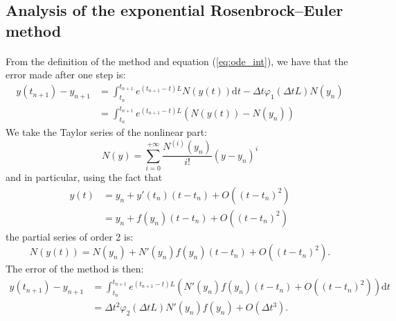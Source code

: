     \subsection{Analysis of the exponential Rosenbrock--Euler method}

      \paragraph{}
      From the definition of the method and equation (\ref{eq:ode_int}), we have that the error made after one step is:
      \begin{equation}
        \begin{aligned}
          y\left(t_{n+1}\right) - y_{n+1} &= \int_{t_n}^{t_{n+1}} e^{\left(t_{n+1} - t\right) L} N\left(y\left(t\right)\right) \mathrm{d}t  - \Delta t \varphi_1\left(\Delta t L\right) N\left(y_n\right) \\
          &= \int_{t_n}^{t_{n+1}} e^{\left(t_{n+1} - t\right) L} \left( N\left(y\left(t\right)\right) - N\left(y_n\right) \right)
        \end{aligned}
      \end{equation}
      We take the Taylor series of the nonlinear part:
      \begin{equation}
        N\left(y\right) = \sum_{i = 0}^{+\infty} \frac{N^{\left(i\right)}\left(y_n\right)}{i!}\left(y - y_n\right)^i
      \end{equation}
      and in particular, using the fact that
      \begin{equation}
        \begin{aligned}
          y\left(t\right) &= y_n + y'\left(t_n\right)\left(t - t_n\right) + O\left(\left(t - t_n\right)^2\right) \\
          & = y_n + f\left(y_n\right)\left(t - t_n\right) + O\left(\left(t - t_n\right)^2\right)
        \end{aligned}
      \end{equation}
      the partial series of order 2 is:
      \begin{equation}
        N\left(y\left(t\right)\right) = N\left(y_n\right) + N'\left(y_n\right)f\left(y_n\right)\left(t - t_n\right) + O\left(\left(t - t_n\right)^2\right) .
      \end{equation}
      The error of the method is then:
      \begin{equation}
        \begin{aligned}
          y\left(t_{n+1}\right) - y_{n+1} &= \int_{t_n}^{t_{n+1}} e^{\left(t_{n+1} - t\right) L} \left( N'\left(y_n\right)f\left(y_n\right)\left(t - t_n\right) + O\left(\left(t - t_n\right)^2\right) \right) \mathrm{d}t \\
          &= \Delta t^2\varphi_2\left(\Delta t L\right) N'\left(y_n\right)f\left(y_n\right) + O\left(\Delta t^3\right) .
        \end{aligned}
      \end{equation}
